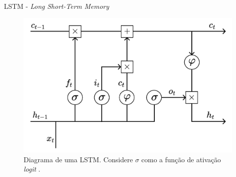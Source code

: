 \documentclass[xcolor=table]{beamer}
\begin{document}
    \begin{frame}{LSTM - \textit{Long Short-Term Memory}}
       \begin{figure}
            \centering
            \includegraphics[scale=0.25]{figuras/lstm_cell.pdf}
	        \caption{Diagrama de uma LSTM. Considere $\sigma$ como a função de ativação \textit{logit} \citep[adaptado de][]{kamath2019}.}
        \end{figure}
    \end{frame}
\end{document}
